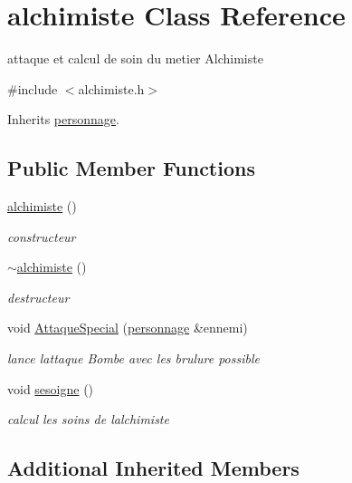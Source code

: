 \hypertarget{classalchimiste}{}\section{alchimiste Class Reference}
\label{classalchimiste}


attaque et calcul de soin du metier Alchimiste  




{\ttfamily \#include $<$alchimiste.\+h$>$}



Inherits \mbox{\hyperlink{classpersonnage}{personnage}}.

\subsection*{Public Member Functions}
\begin{DoxyCompactItemize}
\item 
\mbox{\hyperlink{classalchimiste_a64e152094587979b16814f3723dec41b}{alchimiste}} ()
\begin{DoxyCompactList}\small\item\em constructeur \end{DoxyCompactList}\item 
\mbox{\hyperlink{classalchimiste_a745d9621bd0f7ec7de18aac096b6c87c}{$\sim$alchimiste}} ()
\begin{DoxyCompactList}\small\item\em destructeur \end{DoxyCompactList}\item 
void \mbox{\hyperlink{classalchimiste_a2dc3e30d4b4c9847da55587b39aaf233}{Attaque\+Special}} (\mbox{\hyperlink{classpersonnage}{personnage}} \&ennemi)
\begin{DoxyCompactList}\small\item\em lance l\textquotesingle{}attaque Bombe avec les brulure possible \end{DoxyCompactList}\item 
void \mbox{\hyperlink{classalchimiste_a6c5aabd22117117c285c8230bd7b5692}{sesoigne}} ()
\begin{DoxyCompactList}\small\item\em calcul les soins de l\textquotesingle{}alchimiste \end{DoxyCompactList}\end{DoxyCompactItemize}
\subsection*{Additional Inherited Members}


